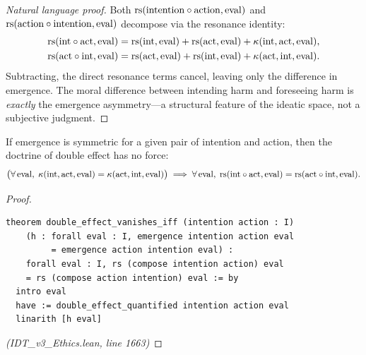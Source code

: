 \begin{proof}[Natural language proof]
Both $\mathrm{rs}(\mathrm{intention} \circ \mathrm{action}, \mathrm{eval})$ and
$\mathrm{rs}(\mathrm{action} \circ \mathrm{intention}, \mathrm{eval})$ decompose
via the resonance identity:
\begin{align*}
  \mathrm{rs}(\mathrm{int} \circ \mathrm{act}, \mathrm{eval})
  &= \mathrm{rs}(\mathrm{int}, \mathrm{eval}) + \mathrm{rs}(\mathrm{act}, \mathrm{eval})
  + \kappa(\mathrm{int}, \mathrm{act}, \mathrm{eval}), \\
  \mathrm{rs}(\mathrm{act} \circ \mathrm{int}, \mathrm{eval})
  &= \mathrm{rs}(\mathrm{act}, \mathrm{eval}) + \mathrm{rs}(\mathrm{int}, \mathrm{eval})
  + \kappa(\mathrm{act}, \mathrm{int}, \mathrm{eval}).
\end{align*}
Subtracting, the direct resonance terms cancel, leaving only the difference
in emergence. The moral difference between intending harm and foreseeing harm
is \emph{exactly} the emergence asymmetry---a structural feature of the
ideatic space, not a subjective judgment.
\end{proof}

\begin{theorem}
\label{thm:double-effect-vanishes}
If emergence is symmetric for a given pair of intention and action, then
the doctrine of double effect has no force:
\[
  \bigl(\forall\, \mathrm{eval},\; \kappa(\mathrm{int}, \mathrm{act}, \mathrm{eval})
  = \kappa(\mathrm{act}, \mathrm{int}, \mathrm{eval})\bigr)
  \implies
  \forall\, \mathrm{eval},\; \mathrm{rs}(\mathrm{int} \circ \mathrm{act}, \mathrm{eval})
  = \mathrm{rs}(\mathrm{act} \circ \mathrm{int}, \mathrm{eval}).
\]
\end{theorem}

\begin{proof}
\begin{lstlisting}
theorem double_effect_vanishes_iff (intention action : I)
    (h : forall eval : I, emergence intention action eval
         = emergence action intention eval) :
    forall eval : I, rs (compose intention action) eval
    = rs (compose action intention) eval := by
  intro eval
  have := double_effect_quantified intention action eval
  linarith [h eval]
\end{lstlisting}
\textit{(IDT\_v3\_Ethics.lean, line 1663)}
\end{proof}

